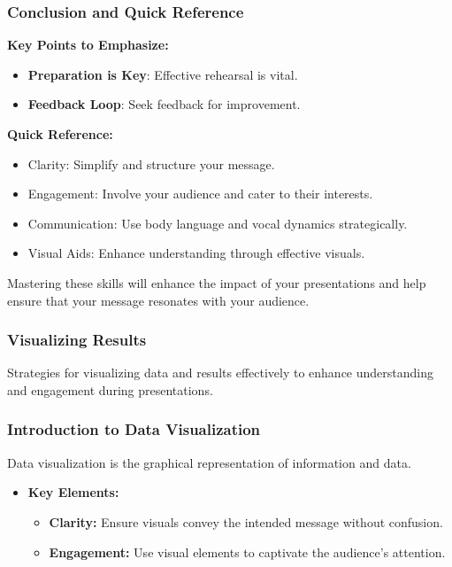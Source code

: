 \documentclass[aspectratio=169]{beamer}
\begin{document}
\begin{frame}[fragile]
    \frametitle{Conclusion and Quick Reference}
    \textbf{Key Points to Emphasize:}
    \begin{itemize}
        \item \textbf{Preparation is Key}: Effective rehearsal is vital.
        \item \textbf{Feedback Loop}: Seek feedback for improvement.
    \end{itemize}
    
    \textbf{Quick Reference:}
    \begin{itemize}
        \item Clarity: Simplify and structure your message.
        \item Engagement: Involve your audience and cater to their interests.
        \item Communication: Use body language and vocal dynamics strategically.
        \item Visual Aids: Enhance understanding through effective visuals.
    \end{itemize}

    Mastering these skills will enhance the impact of your presentations and help ensure that your message resonates with your audience.
\end{frame}

\begin{frame}[fragile]
  \frametitle{Visualizing Results}
  Strategies for visualizing data and results effectively to enhance understanding and engagement during presentations.
\end{frame}

\begin{frame}[fragile]
  \frametitle{Introduction to Data Visualization}
  Data visualization is the graphical representation of information and data.
  \begin{itemize}
    \item \textbf{Key Elements:}
      \begin{itemize}
        \item \textbf{Clarity:} Ensure visuals convey the intended message without confusion.
        \item \textbf{Engagement:} Use visual elements to captivate the audience's attention.
      \end{itemize}
  \end{itemize}
\end{frame}
\end{document}
